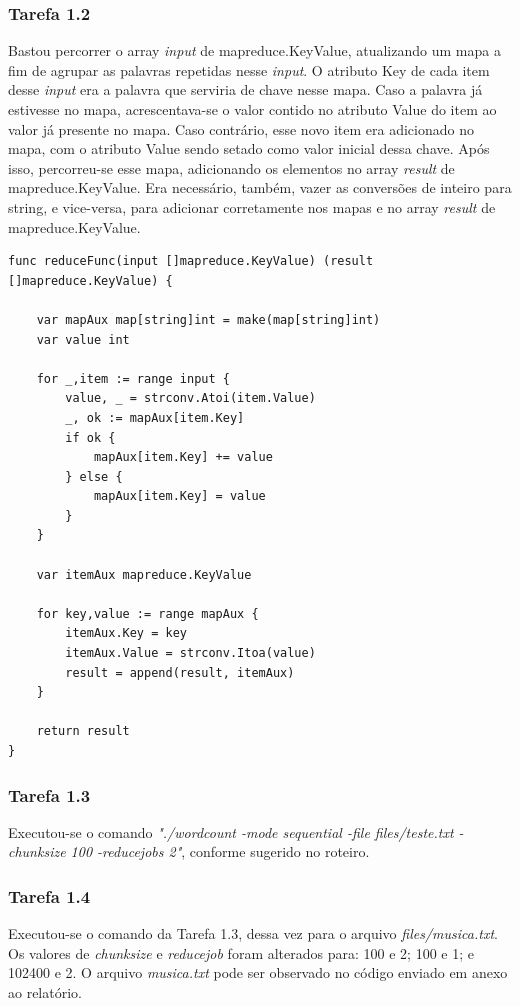 \documentclass[conference]{IEEEtran}
\begin{document}
\subsubsection{Tarefa 1.2} Bastou percorrer o array \textit{input} de mapreduce.KeyValue, atualizando um mapa a fim de agrupar as palavras repetidas nesse \textit{input}. O atributo Key de cada item desse \textit{input} era a palavra que serviria de chave nesse mapa. Caso a palavra já estivesse no mapa, acrescentava-se o valor contido no atributo Value do item ao valor já presente no mapa. Caso contrário, esse novo item era adicionado no mapa, com o atributo Value sendo setado como valor inicial dessa chave. Após isso, percorreu-se esse mapa, adicionando os elementos no array \textit{result} de mapreduce.KeyValue. Era necessário, também, vazer as conversões de inteiro para string, e vice-versa, para adicionar corretamente nos mapas e no array \textit{result} de mapreduce.KeyValue.

\begin{lstlisting}
func reduceFunc(input []mapreduce.KeyValue) (result []mapreduce.KeyValue) {

	var mapAux map[string]int = make(map[string]int)
	var value int

	for _,item := range input {
		value, _ = strconv.Atoi(item.Value)
		_, ok := mapAux[item.Key]
		if ok {
			mapAux[item.Key] += value
		} else {
			mapAux[item.Key] = value
		}
	}

	var itemAux mapreduce.KeyValue

	for key,value := range mapAux {
		itemAux.Key = key
		itemAux.Value = strconv.Itoa(value)
		result = append(result, itemAux)
	}
	
	return result
}
\end{lstlisting}

\subsubsection{Tarefa 1.3} Executou-se o comando \textit{"./wordcount -mode sequential -file files/teste.txt -chunksize 100 -reducejobs 2"}, conforme sugerido no roteiro.

\subsubsection{Tarefa 1.4} Executou-se o comando da Tarefa 1.3, dessa vez para o arquivo \textit{files/musica.txt}. Os valores de \textit{chunksize} e \textit{reducejob} foram alterados para: 100 e 2; 100 e 1; e 102400 e 2. O arquivo \textit{musica.txt} pode ser observado no código enviado em anexo ao relatório.
\end{document}
